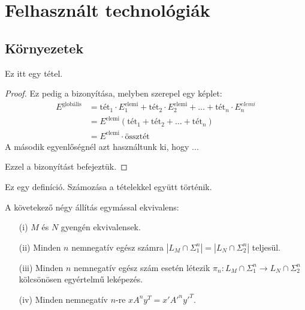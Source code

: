 
\chapter{Felhasznált technológiák}
\section{Környezetek}
\begin{tet}
	\label{tet-alap}
	Ez itt egy tétel.
\end{tet}

\begin{proof}
	Ez pedig a bizonyítása, melyben szerepel egy képlet:
	\begin{equation}
		\begin{split}
			E^{\text{globális}} &= \text{tét}_1\cdot E_1^{\text{elemi}}+\text{tét}_2\cdot
			E_2^{\text{elemi}}+\ldots+\text{tét}_n\cdot E_n^{elemi} \\
			&=E^{\text{elemi}}\left(\text{tét}_1+\text{tét}_2+\ldots+\text{tét}_n\right)\\
			&=E^{\text{elemi}}\cdot\text{össztét}
		\end{split}
	\end{equation}
	A második egyenlőségnél azt használtunk ki, hogy ...

	Ezzel a bizonyítást befejeztük.
\end{proof}

\begin{defi}
	\label{def-pelda}
	Ez egy definíció. Számozása a tételekkel együtt történik.
\end{defi}

\begin{áll}
A követekező négy állítás egymással ekvivalens:
\label{áll-ekvivalencia}
\begin{itemize}
	\item[(i)] $M$ és $N$ gyengén ekvivalensek.
	\item[(ii)] Minden $n$
		nemnegatív egész számra $|L_{M}\cap \Sigma_{1}^{n}|=|L_{N}\cap \Sigma_{2}^{n}|$ teljesül.
	\item[(iii)] Minden $n$ nemnegatív egész szám esetén
		létezik
		$ \pi_{n}: L_{M}\cap \Sigma_{1}^{n} \rightarrow L_{N}\cap \Sigma_{2}^{n} $ kölcsönösen egyértelmű
		leképezés.
	\item[(iv)] Minden nemnegatív $n$-re $x A^{n} y^{T}=x' A'^{n} y'^{T}$.
\end{itemize}
\end{áll}

